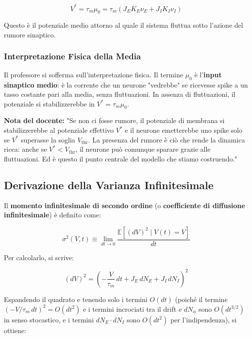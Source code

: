 \begin{equation}
V^* = \tau_m \mu_0 = \tau_m (J_E K_E \nu_E + J_I K_I \nu_I)
\end{equation}

Questo è il potenziale medio attorno al quale il sistema fluttua sotto l'azione del rumore sinaptico.

\subsubsection{Interpretazione Fisica della Media}

Il professore si sofferma sull'interpretazione fisica. Il termine $\mu_0$ è l'\textbf{input sinaptico medio}: è la corrente che un neurone "vedrebbe" se ricevesse spike a un tasso costante pari alla media, senza fluttuazioni. In assenza di fluttuazioni, il potenziale si stabilizzerebbe in $V^* = \tau_m \mu_0$.

\begin{tcolorbox}[colback=gray!5, colframe=gray!40, arc=2mm, boxrule=0.5pt]
\textbf{Nota del docente:} "Se non ci fosse rumore, il potenziale di membrana si stabilizzerebbe al potenziale effettivo $V^*$ e il neurone emetterebbe uno spike solo se $V^*$ superasse la soglia $V_{\text{thr}}$. La presenza del rumore è ciò che rende la dinamica ricca: anche se $V^* < V_{\text{thr}}$, il neurone può comunque sparare grazie alle fluttuazioni. Ed è questo il punto centrale del modello che stiamo costruendo."
\end{tcolorbox}


\subsection{Derivazione della Varianza Infinitesimale}



Il \textbf{momento infinitesimale di secondo ordine} (o \textbf{coefficiente di diffusione infinitesimale}) è definito come:

\begin{equation}
\sigma^2(V, t) \equiv \lim_{dt \to 0} \frac{\mathbb{E}[(dV)^2 \mid V(t) = V]}{dt}
\end{equation}

Per calcolarlo, si scrive:

\begin{equation}
(dV)^2 = \left(-\frac{V}{\tau_m}\, dt + J_E\, dN_E + J_I\, dN_I\right)^2
\end{equation}

Espandendo il quadrato e tenendo solo i termini $O(dt)$ (poiché il termine $(-V/\tau_m\, dt)^2 = O(dt^2)$ e i termini incrociati tra il drift e $dN_\alpha$ sono $O(dt^{3/2})$ in senso stocastico, e i termini $dN_E \cdot dN_I$ sono $O(dt^2)$ per l'indipendenza), si ottiene:

